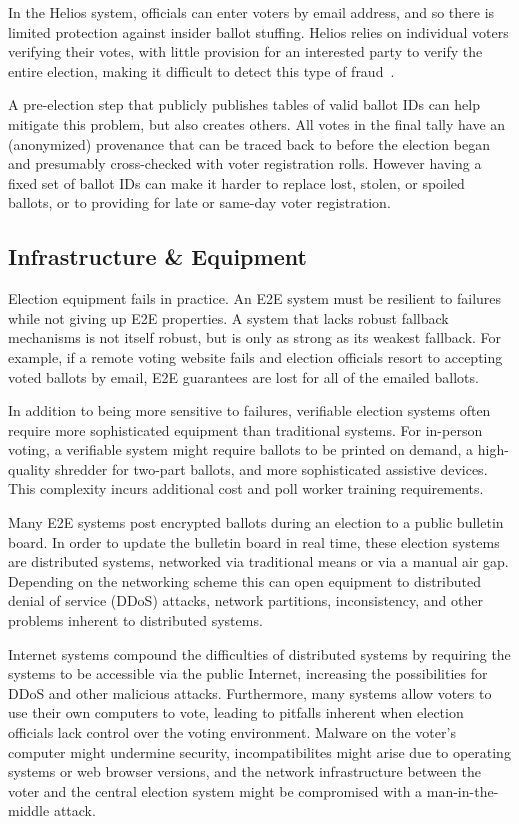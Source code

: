 In the Helios system, officials can enter voters by email address, and
so there is limited protection against insider ballot stuffing. Helios
relies on individual voters verifying their votes, with little
provision for an interested party to verify the entire election,
making it difficult to detect this type of fraud~\cite{orion2009}.

A pre-election step that publicly publishes tables of valid ballot IDs
can help mitigate this problem, but also creates others. All votes in
the final tally have an (anonymized) provenance that can be traced
back to before the election began and presumably cross-checked with
voter registration rolls. However having a fixed set of ballot IDs can
make it harder to replace lost, stolen, or spoiled ballots, or to
providing for late or same-day voter registration.

\subsection{Infrastructure \& Equipment}

Election equipment fails in practice. An E2E system must be resilient
to failures while not giving up E2E properties. A system that lacks
robust fallback mechanisms is not itself robust, but is only as strong
as its weakest fallback. For example, if a remote voting website fails
and election officials resort to accepting voted ballots by email, E2E
guarantees are lost for all of the emailed ballots.

In addition to being more sensitive to failures, verifiable election
systems often require more sophisticated equipment than traditional
systems. For in-person voting, a verifiable system might require
ballots to be printed on demand, a high-quality shredder for two-part
ballots, and more sophisticated assistive devices. This complexity
incurs additional cost and poll worker training requirements.

Many E2E systems post encrypted ballots during an election to a public
bulletin board. In order to update the bulletin board in real time,
these election systems are distributed systems, networked via
traditional means or via a manual air gap. Depending on the networking
scheme this can open equipment to distributed denial of service (DDoS)
attacks, network partitions, inconsistency, and other problems
inherent to distributed systems.

Internet systems compound the difficulties of distributed systems by
requiring the systems to be accessible via the public Internet,
increasing the possibilities for DDoS and other malicious
attacks. Furthermore, many systems allow voters to use their own
computers to vote, leading to pitfalls inherent when election
officials lack control over the voting environment. Malware on the
voter's computer might undermine security, incompatibilites might
arise due to operating systems or web browser versions, and the
network infrastructure between the voter and the central election
system might be compromised with a man-in-the-middle attack.

